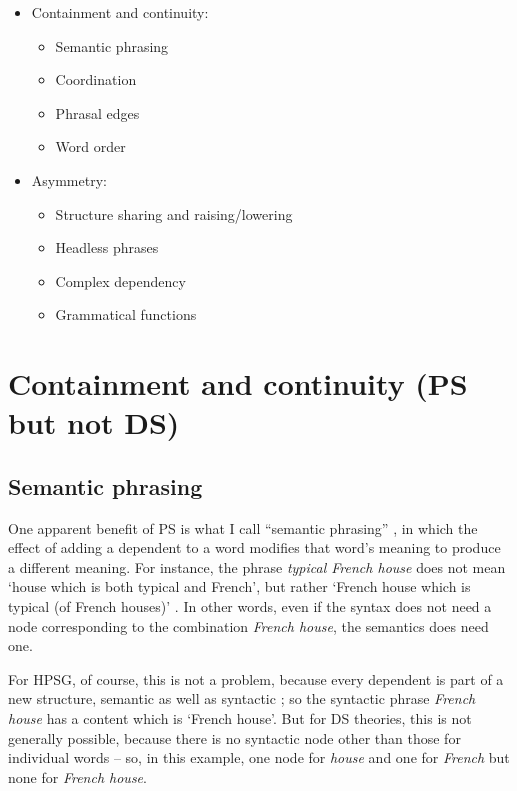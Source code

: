 \documentclass[output=paper
	        ,collection
	        ,collectionchapter
 	        ,biblatex
                ,babelshorthands
                ,newtxmath
                ,draftmode
                ,colorlinks, citecolor=brown
]{./langsci/langscibook}
\begin{document}
\begin{itemize}
	\item  Containment and continuity:
	\begin{itemize}
		\item Semantic phrasing
		
		\item Coordination
		
		\item Phrasal edges
		
		\item Word order
	\end{itemize}

	\item Asymmetry:
	\begin{itemize}
		\item Structure sharing and raising/lowering
		
		\item Headless phrases
		
		\item Complex dependency
		
		\item Grammatical functions
	\end{itemize}
\end{itemize}


\section{Containment and continuity (PS but not DS)}
\label{sec:4}

\subsection{Semantic phrasing}
\label{sec:4.1}

One apparent benefit of PS is what I call ``semantic phrasing'' \citep[146–151]{Hudson90a-u}, in which the effect of adding a dependent to a word modifies that word’s meaning to produce a different meaning. For instance, the phrase \emph{typical French house} does not mean ‘house which is both typical and French’, but rather ‘French house which is typical (of French houses)’ \citep{Dahl80a}. In other words, even if the syntax does not need a node corresponding to the combination \emph{French house}, the semantics does need one.

For HPSG, of course, this is not a problem, because every dependent is part of a new structure, semantic as well as syntactic \citep{MuellerEvaluating}; so the syntactic phrase \emph{French house} has a content which is ‘French house’. But for DS theories, this is not generally possible, because there is no syntactic node other than those for individual words – so, in this example, one node for \emph{house} and one for \emph{French} but none for \emph{French house}.
\end{document}

